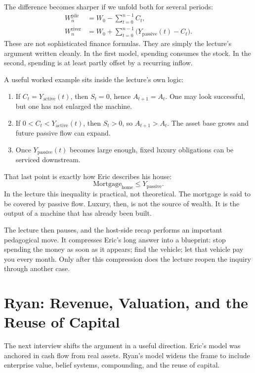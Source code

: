 The difference becomes sharper if we unfold both for several periods:
\begin{align}
W_n^{\mathrm{pile}} &= W_0-\sum_{t=0}^{n-1} C_t,\\
W_n^{\mathrm{river}} &= W_0+\sum_{t=0}^{n-1}\bigl(Y_{\mathrm{passive}}(t)-C_t\bigr).
\end{align}
These are not sophisticated finance formulas. They are simply the lecture's argument written cleanly. In the first model, spending consumes the stock. In the second, spending is at least partly offset by a recurring inflow.

A useful worked example sits inside the lecture's own logic:
\begin{enumerate}
\item If \(C_t=Y_{\mathrm{active}}(t)\), then \(S_t=0\), hence \(A_{t+1}=A_t\). One may look successful, but one has not enlarged the machine.
\item If \(0<C_t<Y_{\mathrm{active}}(t)\), then \(S_t>0\), so \(A_{t+1}>A_t\). The asset base grows and future passive flow can expand.
\item Once \(Y_{\mathrm{passive}}(t)\) becomes large enough, fixed luxury obligations can be serviced downstream.
\end{enumerate}

That last point is exactly how Eric describes his house:
\begin{equation}
\text{Mortgage}_{\text{home}} \le Y_{\mathrm{passive}}.
\end{equation}
In the lecture this inequality is practical, not theoretical. The mortgage is said to be covered by passive flow. Luxury, then, is not the source of wealth. It is the output of a machine that has already been built.

The lecture then pauses, and the host-side recap performs an important pedagogical move. It compresses Eric's long answer into a blueprint: stop spending the money as soon as it appears; find the vehicle; let that vehicle pay you every month. Only after this compression does the lecture reopen the inquiry through another case.

\section{Ryan: Revenue, Valuation, and the Reuse of Capital}

The next interview shifts the argument in a useful direction. Eric's model was anchored in cash flow from real assets. Ryan's model widens the frame to include enterprise value, belief systems, compounding, and the reuse of capital.

